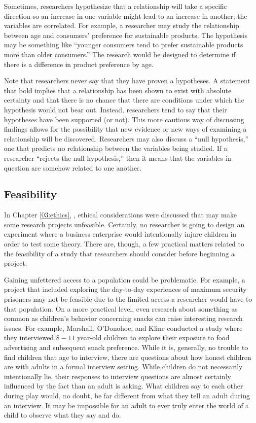 Sometimes, researchers hypothesize that a relationship will take a specific direction so an increase in one variable might lead to an increase in another; the variables are correlated. For example, a researcher may study the relationship between age and consumers' preference for sustainable products. The hypothesis may be something like ``younger consumers tend to prefer sustainable products more than older consumers.'' The research would be designed to determine if there is a difference in product preference by age. 

Note that researchers never say that they have proven a hypotheses. A statement that bold implies that a relationship has been shown to exist with absolute certainty and that there is no chance that there are conditions under which the hypothesis would not bear out. Instead, researchers tend to say that their hypotheses have been supported (or not). This more cautious way of discussing findings allows for the possibility that new evidence or new ways of examining a relationship will be discovered. Researchers may also discuss a ``null hypothesis,'' one that predicts no relationship between the variables being studied. If a researcher ``rejects the null hypothesis,'' then it means that the variables in question are somehow related to one another.

\subsection{Feasibility}

In Chapter \ref{03:ethics}, , ethical considerations were discussed that may make some research projects unfeasible. Certainly, no researcher is going to design an experiment where a business enterprise would intentionally injure children in order to test some theory. There are, though, a few practical matters related to the feasibility of a study that researchers should consider before beginning a project. 

Gaining unfettered access to a population could be problematic. For example, a project that included exploring the day-to-day experiences of maximum security prisoners may not be feasible due to the limited access a researcher would have to that population. On a more practical level, even research about something as common as children's behavior concerning snacks can raise interesting research issues. For example, Marshall, O'Donohoe, and Kline\cite{marshall2007families} conducted a study where they interviewed $ 8-11 $ year-old children to explore their exposure to food advertising and subsequent snack preference. While it is, generally, no trouble to find children that age to interview, there are questions about how honest children are with adults in a formal interview setting. While children do not necessarily intentionally lie, their responses to interview questions are almost certainly influenced by the fact than an adult is asking. What children say to each other during play would, no doubt, be far different from what they tell an adult during an interview. It may be impossible for an adult to ever truly enter the world of a child to observe what they say and do. 

